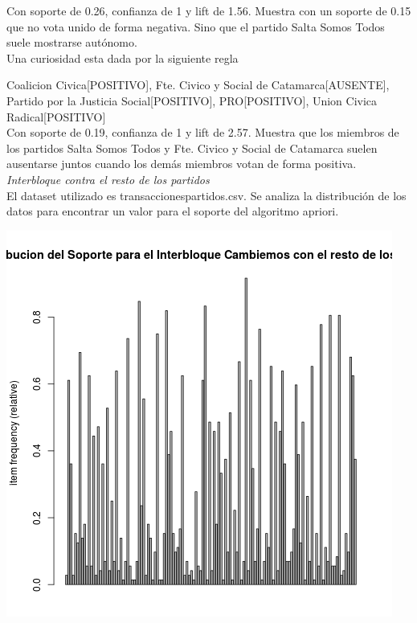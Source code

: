 \documentclass{endm}
\begin{document}
Con soporte de 0.26, confianza de 1 y lift de 1.56. Muestra  con un soporte de 0.15 que no vota unido de forma negativa. Sino que el partido Salta Somos Todos suele mostrarse autónomo. \\

Una curiosidad esta dada por la siguiente regla

{Coalicion Civica[POSITIVO],                    
Fte. Civico y Social de Catamarca[AUSENTE], 
Partido por la Justicia Social[POSITIVO], 
PRO[POSITIVO], 
Union Civica Radical[POSITIVO]}              \\

Con soporte de 0.19, confianza de 1 y lift de 2.57. Muestra que los miembros de los partidos Salta Somos Todos y Fte. Civico y Social de Catamarca suelen ausentarse juntos cuando los demás miembros votan de forma positiva. \\


\textit{Interbloque contra el resto de los partidos} \\

El dataset utilizado es transaccionespartidos.csv. Se analiza la distribución de los datos para encontrar un valor para el soporte del algoritmo apriori. \\

\begin{center}
\includegraphics[scale=0.4]{graficos/soportesCambiemosRestoPartidos.png}
\end{center}
\end{document}
